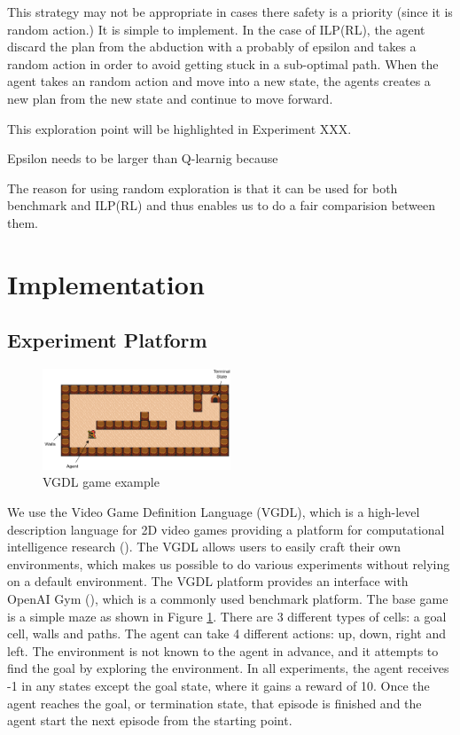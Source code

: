 This strategy may not be appropriate in cases there safety is a priority (since it is random action.)
It is simple to implement.
In the case of ILP(RL), the agent discard the plan from the abduction with a probably of epsilon and takes a random action in order to avoid getting stuck in a sub-optimal path.
When the agent takes an random action and move into a new state, the agents creates a new plan from the new state and continue to move forward.

This exploration point will be highlighted in Experiment XXX.

Epsilon needs to be larger than Q-learnig because

The reason for using random exploration is that it can be used for both benchmark and ILP(RL) and thus enables us to do a fair comparision between them.

\section{Implementation}
\label{Implementation}

\subsection{Experiment Platform}

\begin{figure}[!ht!b]
\centering
\includegraphics[width=0.5\textwidth]{./figures/env_sample}
\caption{VGDL game example}
\label{VGDL_sample}
\end{figure}

We use the Video Game Definition Language (VGDL), which is a high-level description language for 2D video games providing a platform for computational intelligence research (\cite{Schaul2013}).
The VGDL allows users to easily craft their own environments, which makes us possible to do various experiments without relying on a default environment. The VGDL platform provides an interface with OpenAI Gym (\cite{Brockman2016}), which is a commonly used benchmark platform.
The base game is a simple maze as shown in Figure \ref{VGDL_sample}.
There are 3 different types of cells: a goal cell, walls and paths. The agent can take 4 different actions: up, down, right and left.
The environment is not known to the agent in advance, and it attempts to find the goal by exploring the environment.
In all experiments, the agent receives -1 in any states except the goal state, where it gains a reward of 10.
Once the agent reaches the goal, or termination state, that episode is finished and the agent start the next episode from the starting point.

